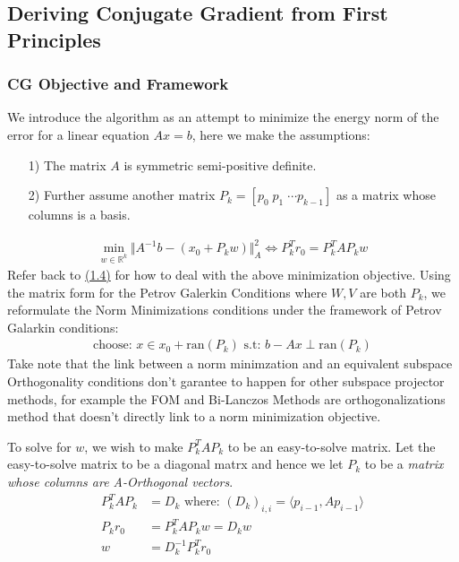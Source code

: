 \documentclass[]{article}
\theoremstyle{definition}
\begin{document}
    \subsection{Deriving Conjugate Gradient from First Principles}
        \subsubsection{CG Objective and Framework}
            We introduce the algorithm as an attempt to minimize the energy norm of the error for a linear equation $Ax = b$, here we make the assumptions: 
            \begin{itemize}
                \item [1)] The matrix $A$ is symmetric semi-positive definite.  
                \item [2)] Further assume another matrix $P_k = [p_0 \;p_1\;\cdots p_{k-1}]$ as a matrix whose columns is a basis.
            \end{itemize}
            \begin{align}
                \min_{w \in \mathbb{R}^k}\Vert 
                    A^{-1}b - (x_0 + P_kw)
                \Vert_A^2 \iff P^T_kr_0 = P_k^TAP_kw
            \end{align}
            Refer back to \hyperref[sec:1.4]{(1.4)} for how to deal with the above minimization objective. Using the matrix form for the Petrov Galerkin Conditions where $W, V$ are both $P_k$, we reformulate the Norm Minimizations conditions under the framework of Petrov Galarkin conditions: 
            \begin{align}
                \text{choose: }x \in x_0 + \text{ran}(P_k) \text{ s.t: } b - Ax \perp \text{ran}(P_k)    
            \end{align}
            Take note that the link between a norm minimzation and an equivalent subspace Orthogonality conditions don't garantee to happen for other subspace projector methods, for example the FOM and Bi-Lanczos Methods are orthogonalizations method that doesn't directly link to a norm minimization objective. 
            \par
            To solve for $w$, we wish to make $P_k^TAP_k$ to be an easy-to-solve matrix. Let the easy-to-solve matrix to be a diagonal matrx and hence we let $P_k$ to be a \textit{matrix whose columns are A-Orthogonal vectors}.
            \begin{align}
                P^T_kAP_k &= D_k \text{ where: } (D_k)_{i,i} = \langle p_{i - 1}, Ap_{i - 1}\rangle
                \\
                P_kr_0 &= P^T_kAP_kw = D_kw
                \\
                w &= D^{-1}_kP_k^Tr_0
            \end{align}
\end{document}
